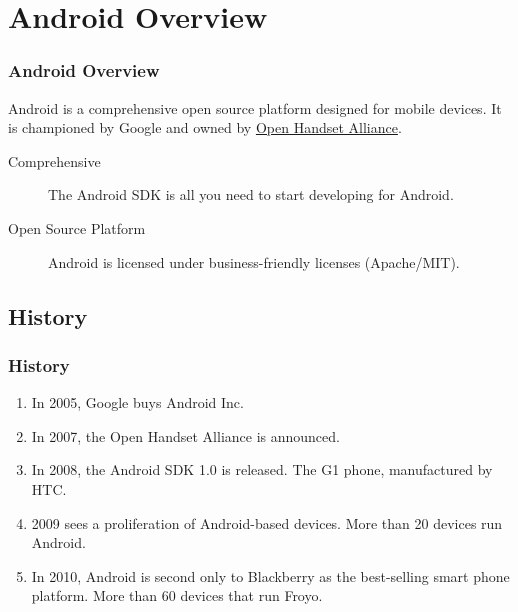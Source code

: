\section{Android Overview}
\begin{frame}
\frametitle{Android Overview}
\alert{Android} is a comprehensive open source platform designed for mobile devices. It is championed by Google and owned by \href{http://www.openhandsetalliance.com/}{Open Handset Alliance}.
\begin{description}
	\item[Comprehensive] The Android SDK is all you need to start developing for Android.
	\item[Open Source Platform] Android is licensed under business-friendly licenses (Apache/MIT).
\end{description}
\end{frame}
\subsection{History}
\begin{frame}
\frametitle{History}
\begin{enumerate}
	\item In 2005, Google buys Android Inc.
	\item In 2007, the Open Handset Alliance is announced.
	\item In 2008, the Android SDK 1.0 is released. The G1 phone, manufactured by HTC.
	\item 2009 sees a proliferation of Android-based devices. More than 20 devices run Android.
	\item In 2010, Android is second only to Blackberry as the best-selling smart phone platform. More than 60 devices that run Froyo.
\end{enumerate}
\end{frame}

